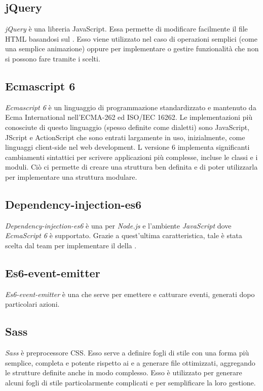 \subsection{jQuery}
\textit{jQuery} è una libreria JavaScript. Essa permette di modificare facilmente il file HTML basandosi sul . Esso viene utilizzato nel caso di operazioni semplici (come una semplice animazione) oppure per implementare o gestire funzionalità che non si possono fare tramite i  scelti.

\subsection{Ecmascript 6}
\textit{Ecmascript 6} è un linguaggio di programmazione standardizzato e mantenuto da Ecma International nell'ECMA-262 ed ISO/IEC 16262. Le implementazioni più conosciute di questo linguaggio (spesso definite come dialetti) sono JavaScript, JScript e ActionScript che sono entrati largamente in uso, inizialmente, come linguaggi client-side nel web development. L versione 6 implementa significanti cambiamenti sintattici per scrivere applicazioni più complesse, incluse le classi e i moduli. Ciò ci permette di creare una struttura ben definita e di poter utilizzarla per implementare una struttura modulare.

\subsection{Dependency-injection-es6}
\textit{Dependency-injection-es6} è una  per \textit{Node.js} e l'ambiente \textit{JavaScript} dove \textit{EcmaScript 6} è supportato. Grazie a quest'ultima caratteristica, tale  è stata scelta dal team per implementare il  della .

\subsection{Es6-event-emitter}
\textit{Es6-event-emitter} è una  che serve per emettere e catturare eventi, generati dopo particolari azioni.

\subsection{Sass}
\textit{Sass} è preprocessore CSS. Esso serve a definire fogli di stile con una forma più semplice, completa e potente rispetto ai  e a generare file  ottimizzati, aggregando le strutture definite anche in modo complesso. Esso è utilizzato per generare alcuni fogli di stile particolarmente complicati e per semplificare la loro gestione.

